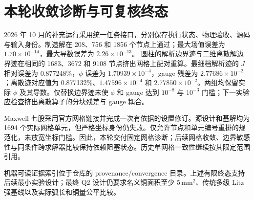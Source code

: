 \section{本轮收敛诊断与可复核终态}
2026 年 10 月的补充运行采用统一任务接口，分别保存执行状态、物理验收、源码与输入身份。制造解在 208、756 和 1856 个节点上通过；最大场值误差为 $1.70\times10^{-14}$，最大导数误差为 $2.26\times10^{-13}$。
圆柱的解析边界迹与二维离散解边界迹在相同的 1683、3672 和 9108 节点挤出网格上配对重算。最细档解析迹的 $J$ 相对误差为 0.877248\%，$\phi$ 误差为 $1.70939\times10^{-4}$，gauge 残差为 $2.77686\times10^{-2}$；离散迹对应值为 0.877132\%、$1.47596\times10^{-4}$ 和 $2.77850\times10^{-2}$。两组均保留实际 $\phi$ 及其导数。仅替换边界迹未使 $\phi$ 和 gauge 达到 $10^{-8}$ 与 $10^{-3}$ 门槛；下一实验应检查挤出离散算子的分块残差与 gauge 耦合。

Maxwell 七股采用官方网格链接并完成一次有依据的设置修订。源设计和基解均为 1694 个实际网格单元，但严格坐标身份仍失败。仅允许节点和单元编号重排的规范化，未放宽坐标门槛。因此，本轮交付固定网格诊断；后续网格收敛、边界敏感性与同条件跨求解器比较保持依赖阻塞状态。历史单网格一致性继续按其限定范围引用。

机器可读证据索引位于仓库的 provenance/convergence 目录。上述有限终态支持后续最小实验设计；最终 Q2 设计仍要求名义铜面积至少 $5\,\mathrm{mm^2}$、传统多级 Litz 强基线以及实际弧长和铜量公平比较。
